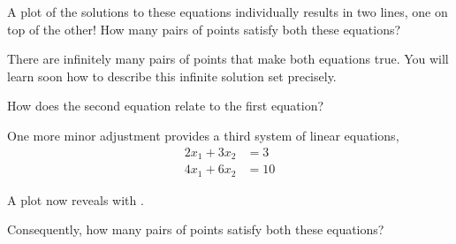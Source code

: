 \documentclass{ximera}
\begin{document}
\begin{problem}
\begin{example}
    \begin{question}
      A plot of the solutions to these equations individually results in two lines, one on top of the other!  How many pairs of points satisfy both these equations?
      \begin{multipleChoice}
      \end{multipleChoice}    
    
      \begin{feedback}
        There are infinitely many pairs of points that make both equations true.  You will learn soon how to describe this infinite solution set precisely.
      \end{feedback}
    \end{question}

    \begin{question}
      How does the second equation relate to the first equation?
      \begin{multipleChoice}
      \end{multipleChoice}
    \end{question}
  \end{example}

  \begin{example}
    One more minor adjustment provides a third system of linear equations,
    \begin{align*}
      2x_1+3x_2&=3\\
      4x_1+6x_2&=10
    \end{align*}

    \begin{question}
      A plot now reveals  with .
    \end{question}

    \begin{question}
      Consequently, how many pairs of points satisfy both these equations?
      \begin{multipleChoice}
      \end{multipleChoice}    


\end{question}
\end{example}
\end{problem}
\end{document}
